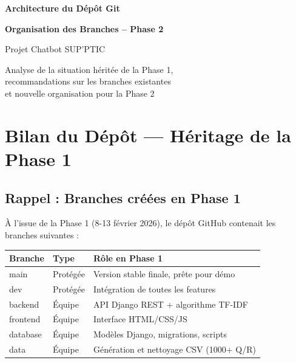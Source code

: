 \documentclass[11pt,a4paper]{article}
\begin{document}
\begin{titlepage}
    \centering
\vspace*{1.5cm}

{\Huge \textbf{Architecture du Dépôt Git}} 

\vspace{0.4cm}
{\LARGE \textbf{Organisation des Branches -- Phase 2}}

\vspace{1.2cm}

{\Large Projet Chatbot SUP'PTIC}

\vspace{1cm}

\begin{minipage}{0.85\textwidth}
    \centering
    \normalsize
    Analyse de la situation héritée de la Phase 1, \\
    recommandations sur les branches existantes \\
    et nouvelle organisation pour la Phase 2
\end{minipage}



\end{titlepage}

\tableofcontents
\clearpage

\section{Bilan du Dépôt — Héritage de la Phase 1}
\label{sec:bilan}

\subsection{Rappel : Branches créées en Phase 1}

À l'issue de la Phase 1 (8-13 février 2026), le dépôt GitHub contenait les branches suivantes :

\vspace{0.5cm}
\begin{center}
\begin{tabular}{>{\ttfamily}l l l}
\toprule
\textbf{Branche} & \textbf{Type} & \textbf{Rôle en Phase 1} \\
\midrule
main     & Protégée & Version stable finale, prête pour démo \\
dev      & Protégée & Intégration de toutes les features \\
backend  & Équipe   & API Django REST + algorithme TF-IDF \\
frontend & Équipe   & Interface HTML/CSS/JS \\
database & Équipe   & Modèles Django, migrations, scripts \\
data     & Équipe   & Génération et nettoyage CSV (1000+ Q/R) \\
\bottomrule
\end{tabular}
\end{center}
\end{document}
